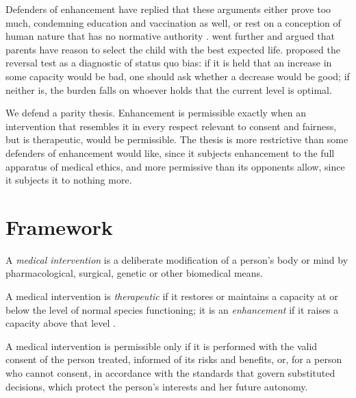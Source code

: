 \documentclass{situationist-preprint}
\begin{document}
Defenders of enhancement have replied that these arguments either prove too much, condemning education and vaccination as well, or rest on a conception of human nature that has no normative authority \citep{Harris2007,Buchanan2011}. \citet{Savulescu2001} went further and argued that parents have reason to select the child with the best expected life. \citet{BostromOrd2006} proposed the reversal test as a diagnostic of status quo bias: if it is held that an increase in some capacity would be bad, one should ask whether a decrease would be good; if neither is, the burden falls on whoever holds that the current level is optimal.

We defend a parity thesis. Enhancement is permissible exactly when an intervention that resembles it in every respect relevant to consent and fairness, but is therapeutic, would be permissible. The thesis is more restrictive than some defenders of enhancement would like, since it subjects enhancement to the full apparatus of medical ethics, and more permissive than its opponents allow, since it subjects it to nothing more.

\section{Framework}

\begin{definition}\label{d:med}
A \emph{medical intervention} is a deliberate modification of a person's body or mind by pharmacological, surgical, genetic or other biomedical means.
\end{definition}

\begin{definition}\label{d:enh}
A medical intervention is \emph{therapeutic} if it restores or maintains a capacity at or below the level of normal species functioning; it is an \emph{enhancement} if it raises a capacity above that level \citep{Boorse1977,Daniels1985}.
\end{definition}

\begin{principle}[Consent]\label{p:consent}
A medical intervention is permissible only if it is performed with the valid consent of the person treated, informed of its risks and benefits, or, for a person who cannot consent, in accordance with the standards that govern substituted decisions, which protect the person's interests and her future autonomy.
\end{principle}
\end{document}
